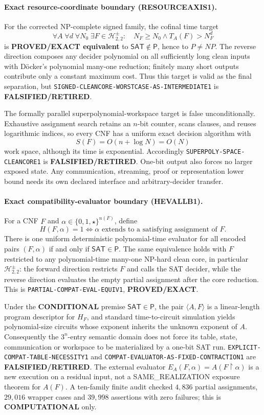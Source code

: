 \documentclass[11pt]{article}
\begin{document}
\paragraph{Exact resource-coordinate boundary (RESOURCEAXIS1).}
For the corrected NP-complete signed family, the cofinal time target
\[
 \forall A\;\forall d\;\forall N_0\;\exists F\in
 \mathcal H^{\pm}_{2,2}:\quad
 N_F\ge N_0\land T_A(F)>N_F^d
\]
is \textbf{PROVED/EXACT equivalent} to \(\mathsf{SAT}\notin\mathsf P\),
hence to \(P\ne NP\).  The reverse direction composes any decider
polynomial on all sufficiently long clean inputs with D\"ocker's
polynomial many-one reduction; finitely many short outputs contribute only
a constant maximum cost.  Thus this target is valid as the final
separation, but \texttt{SIGNED-CLEANCORE-WORSTCASE-AS-INTERMEDIATE1} is
\textbf{FALSIFIED/RETIRED}.

The formally parallel superpolynomial-workspace target is false
unconditionally.  Exhaustive assignment search retains an \(n\)-bit
counter, scans clauses, and reuses logarithmic indices, so every CNF has a
uniform exact decision algorithm with
\[
 S(F)=O(n+\log N)=O(N)
\]
work space, although its time is exponential.
Accordingly \texttt{SUPERPOLY-SPACE-CLEANCORE1} is
\textbf{FALSIFIED/RETIRED}.  One-bit output also forces no larger exposed
state.  Any communication, streaming, proof or representation lower bound
needs its own declared interface and arbitrary-decider transfer.

\paragraph{Exact compatibility-evaluator boundary (HEVALLB1).}
For a CNF \(F\) and \(\alpha\in\{0,1,\star\}^{n(F)}\), define
\[
 H(F,\alpha)=1
 \iff
 \alpha\text{ extends to a satisfying assignment of }F .
\]
There is one uniform deterministic polynomial-time evaluator for all encoded
pairs \((F,\alpha)\) if and only if \(\mathsf{SAT}\in\mathsf P\).  The same
equivalence holds with \(F\) restricted to any polynomial-time many-one
NP-hard clean core, in particular \(\mathcal H^{\pm}_{2,2}\): the forward
direction restricts \(F\) and calls the SAT decider, while the reverse
direction evaluates the empty partial assignment after the core reduction.
This is \texttt{PARTIAL-COMPAT-EVAL-EQUIV1},
\textbf{PROVED/EXACT}.

Under the \textbf{CONDITIONAL} premise \(\mathsf{SAT}\in\mathsf P\), the
pair \(\langle A,F\rangle\) is a linear-length program descriptor for
\(H_F\), and standard time-to-circuit simulation yields polynomial-size
circuits whose exponent inherits the unknown exponent of \(A\).
Consequently the \(3^n\)-entry semantic domain does not force its table,
state, communication or workspace to be materialized by a one-bit SAT run.
\texttt{EXPLICIT-COMPAT-TABLE-NECESSITY1} and
\texttt{COMPAT-EVALUATOR-AS-FIXED-CONTRACTION1} are
\textbf{FALSIFIED/RETIRED}.  The external evaluator
\(E_A(F,\alpha)=A(F\upharpoonright\alpha)\) is a new execution on a residual
input, not a SAME\_REALIZATION exposure theorem for \(A(F)\).
A ten-family finite audit checked \(4{,}836\) partial assignments,
\(29{,}016\) wrapper cases and \(39{,}998\) assertions with zero failures;
this is \textbf{COMPUTATIONAL} only.
\end{document}
